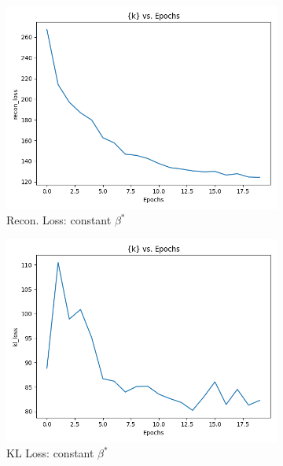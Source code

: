 \documentclass[11pt,addpoints,answers]{exam}
\numberwithin{equation}{section} %
\numberwithin{figure}{section} %
\numberwithin{table}{section} %
\begin{document}
\begin{questions}
\\
\begin{figure}[H]
    \centering
    \begin{subfigure}[b]{0.32\linewidth}
    \includegraphics[width=\linewidth]{2.2a.png}
    \caption{Recon. Loss: constant $\beta^*$}
    \end{subfigure}
    \begin{subfigure}[b]{0.32\linewidth}
    \includegraphics[width=\linewidth]{2.2b.png}
    \caption{KL Loss: constant $\beta^*$}
    \end{subfigure}
    \begin{subfigure}[b]{0.32\linewidth}

\end{subfigure}
\end{figure}
\end{questions}
\end{document}
